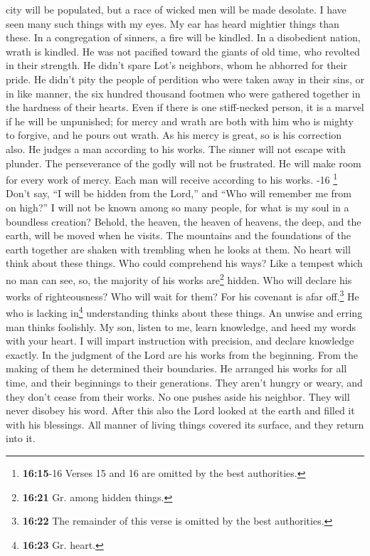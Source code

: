 city will be populated, but a race of wicked men will be made desolate.
 I have seen many such things with my eyes. My ear has
heard mightier things than these.  In a congregation of
sinners, a fire will be kindled. In a disobedient nation, wrath is
kindled.  He was not pacified toward the giants of old
time, who revolted in their strength.  He didn't spare
Lot's neighbors, whom he abhorred for their pride.  He
didn't pity the people of perdition who were taken away in their sins,
 or in like manner, the six hundred thousand footmen who
were gathered together in the hardness of their hearts. 
Even if there is one stiff-necked person, it is a marvel if he will be
unpunished; for mercy and wrath are both with him who is mighty to
forgive, and he pours out wrath.  As his mercy is great,
so is his correction also. He judges a man according to his works.
 The sinner will not escape with plunder. The
perseverance of the godly will not be frustrated.  He
will make room for every work of mercy. Each man will receive according
to his works. -16 \footnote{\textbf{16:15}-16 Verses 15
  and 16 are omitted by the best authorities.}  Don't
say, ``I will be hidden from the Lord,'' and ``Who will remember me from
on high?'' I will not be known among so many people, for what is my soul
in a boundless creation?  Behold, the heaven, the heaven
of heavens, the deep, and the earth, will be moved when he visits.
 The mountains and the foundations of the earth together
are shaken with trembling when he looks at them.  No
heart will think about these things. Who could comprehend his ways?
 Like a tempest which no man can see, so, the majority of
his works are\footnote{\textbf{16:21} Gr. among hidden things.} hidden.
 Who will declare his works of righteousness? Who will
wait for them? For his covenant is afar off.\footnote{\textbf{16:22} The
  remainder of this verse is omitted by the best authorities.}
 He who is lacking in\footnote{\textbf{16:23} Gr. heart.}
understanding thinks about these things. An unwise and erring man thinks
foolishly.  My son, listen to me, learn knowledge, and
heed my words with your heart.  I will impart instruction
with precision, and declare knowledge exactly.  In the
judgment of the Lord are his works from the beginning. From the making
of them he determined their boundaries.  He arranged his
works for all time, and their beginnings to their generations. They
aren't hungry or weary, and they don't cease from their works.
 No one pushes aside his neighbor. They will never
disobey his word.  After this also the Lord looked at the
earth and filled it with his blessings.  All manner of
living things covered its surface, and they return into it.

